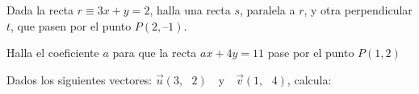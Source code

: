 \documentclass[spanish, 11pt]{exam}
\begin{document}
\begin{questions}
\question Dada la recta $r\equiv 3x + y = 2$, halla una recta $s$, paralela a $r$, y otra perpendicular $t$, que pasen por el punto $P(2, – 1)$.
\begin{solution} \end{solution}

\question Halla el coeficiente $a$ para que la recta $ax + 4y = 11$ pase por el punto $P(1, 2)$
\begin{solution} \end{solution}

\question	Dados los siguientes vectores: $\overrightarrow u \left( {3,{\text{ }}2} \right){\text{ }}$ y ${\text{ }}\overrightarrow v \left( {1,{\text{ }}4} \right)$, calcula:
\begin{multicols}{4}
\end{multicols}


\end{questions}
\end{document}
